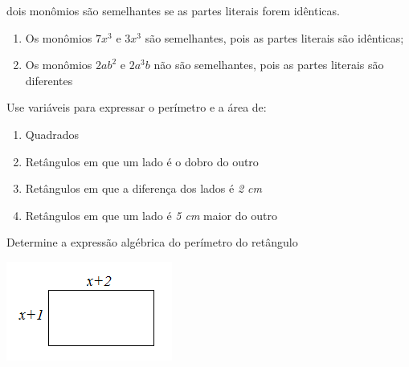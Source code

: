 \begin{tdefinicao}
    dois monômios são semelhantes se as partes literais forem idênticas.
\end{tdefinicao}


\begin{texemplo}\hfill
    \begin{enumerate}[label=(\textbf{\alph*)}]
        \item Os monômios $7x^3$ e $3x^3$ são semelhantes, pois as partes literais são idênticas;
        
        \item Os monômios  $2ab^2$ e $2a^3b$ não são semelhantes, pois as partes literais são diferentes \qedsymbol
    \end{enumerate}
\end{texemplo}

\exercicios

\settowidth{}

\begin{texercicio}
    Use variáveis para expressar o perímetro e a área de:

    \begin{enumerate}
    \item Quadrados
    \item Retângulos em que um lado é o dobro do outro
    \item Retângulos em que a diferença dos lados é \textit{2 cm}
    \item Retângulos em que um lado é \textit{5 cm} maior do outro
    \end{enumerate}
\end{texercicio}


\begin{texercicio}
    Determine a expressão algébrica do perímetro do retângulo
    
    \begin{center}
        \includegraphics{capitulos/expressoes_algebricas/media/image3.png}
    \end{center}
    
\end{texercicio}


